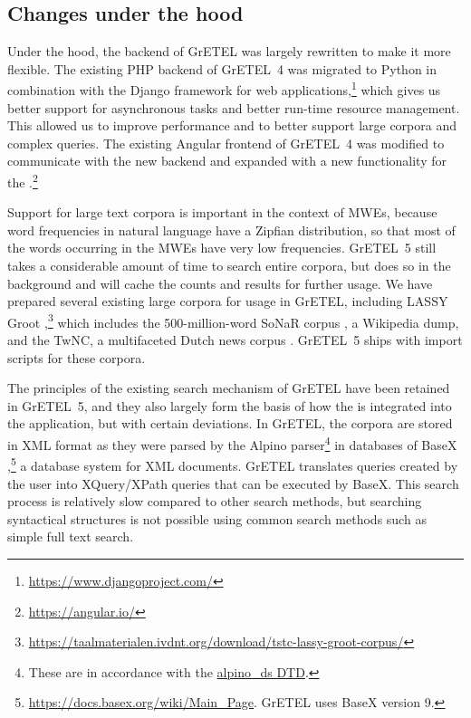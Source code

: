 \documentclass[output=paper,colorlinks,citecolor=brown]{langscibook}
\begin{document}

\subsection{Changes under the hood}
\label{backend}

Under the hood, the backend of GrETEL was largely rewritten to make it more flexible. The existing PHP backend of GrETEL~4 was migrated to Python in combination with the Django framework for web applications,\footnote{\url{https://www.djangoproject.com/}} which gives us better support for asynchronous tasks and better run-time resource management. This allowed us to improve performance and to better support large corpora and complex queries. The existing Angular frontend of GrETEL~4 was modified to communicate with the new backend and expanded with a new functionality for the \mwefinder.\footnote{\url{https://angular.io/}}

Support for large text corpora is important in the context of MWEs, because word frequencies in natural language have a Zipfian distribution, so that most of the words occurring in the  MWEs have very low frequencies. GrETEL~5 still takes a considerable amount of time to search entire corpora, but does so in the background and will cache the counts and results for further usage. We have prepared several existing large corpora for usage in GrETEL, including LASSY Groot \citep{vanNoord:2008},\footnote{\url{https://taalmaterialen.ivdnt.org/download/tstc-lassy-groot-corpus/}} which includes the 500-million-word SoNaR corpus \citep{SONAR:2013}, a Wikipedia dump, and the TwNC, a multifaceted Dutch news corpus \citep{Ordelman:2007}. GrETEL~5 ships with import scripts for these corpora.\largerpage

The principles of the existing search mechanism of GrETEL have been retained in GrETEL~5, and they also largely form the basis of how the {\mwefinder} is integrated into the application, but with certain deviations. In GrETEL, the corpora are stored in  XML format as they were parsed by the Alpino parser\footnote{These are in accordance with the \href{https://github.com/rug-compling/Alpino/blob/master/Treebank/alpino_ds.dtd}{alpino\_ds DTD}.} in databases of BaseX \citep{Gruen:2010},\footnote{\url{https://docs.basex.org/wiki/Main_Page}. GrETEL uses  BaseX version 9.}  a database system for XML documents. GrETEL translates queries created by the user into XQuery/XPath queries that can be executed by BaseX. This search process is relatively slow compared to other search methods, but searching syntactical structures is not possible using common search methods such as simple full text search.
\end{document}
